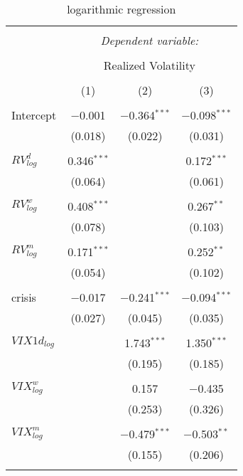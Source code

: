 
\begin{table}[!htbp] \centering 
  \caption{logarithmic regression} 
  \label{} 
\begin{tabular}{@{\extracolsep{5pt}}lccc} 
\\[-1.8ex]\hline 
\hline \\[-1.8ex] 
 & \multicolumn{3}{c}{\textit{Dependent variable:}} \\ 
\cline{2-4} 
\\[-1.8ex] & \multicolumn{3}{c}{Realized Volatility} \\ 
\\[-1.8ex] & (1) & (2) & (3)\\ 
\hline \\[-1.8ex] 
 Intercept & $-$0.001 & $-$0.364$^{***}$ & $-$0.098$^{***}$ \\ 
  & (0.018) & (0.022) & (0.031) \\ 
  & & & \\ 
 $RV^{d}_{log}$ & 0.346$^{***}$ &  & 0.172$^{***}$ \\ 
  & (0.064) &  & (0.061) \\ 
  & & & \\ 
 $RV^{w}_{log}$ & 0.408$^{***}$ &  & 0.267$^{**}$ \\ 
  & (0.078) &  & (0.103) \\ 
  & & & \\ 
 $RV^{m}_{log}$ & 0.171$^{***}$ &  & 0.252$^{**}$ \\ 
  & (0.054) &  & (0.102) \\ 
  & & & \\ 
 crisis & $-$0.017 & $-$0.241$^{***}$ & $-$0.094$^{***}$ \\ 
  & (0.027) & (0.045) & (0.035) \\ 
  & & & \\ 
 $VIX1{d}_{log}$ &  & 1.743$^{***}$ & 1.350$^{***}$ \\ 
  &  & (0.195) & (0.185) \\ 
  & & & \\ 
 $VIX^{w}_{log}$ &  & 0.157 & $-$0.435 \\ 
  &  & (0.253) & (0.326) \\ 
  & & & \\ 
 $VIX^{m}_{log}$ &  & $-$0.479$^{***}$ & $-$0.503$^{**}$ \\ 
  &  & (0.155) & (0.206) \\ 
  & & & \\ 

\end{tabular}
\end{table}
